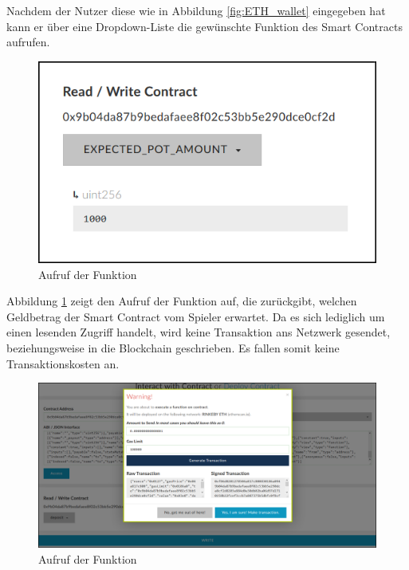 Nachdem der Nutzer diese wie in Abbildung \ref{fig:ETH_wallet} eingegeben hat kann er über eine Dropdown-Liste die gewünschte Funktion des Smart Contracts aufrufen.

\begin{figure}[H]
\centering
\includegraphics[scale=0.85]{Figures/eth_gui/ETH_wallet_expected_amount}
\decoRule
\caption{Aufruf der  Funktion}
\label{fig:ETH_wallet_expected_amount}
\end{figure}

Abbildung \ref{fig:ETH_wallet_expected_amount} zeigt den Aufruf der Funktion auf, die zurückgibt, welchen Geldbetrag der Smart Contract vom Spieler erwartet. Da es sich lediglich um einen lesenden Zugriff handelt, wird keine Transaktion ans Netzwerk gesendet, beziehungsweise in die Blockchain geschrieben. Es fallen somit keine Transaktionskosten an.

\begin{figure}[H]
\centering
\includegraphics[width=1\linewidth]{Figures/eth_gui/ETH_wallet_deposit}
\decoRule
\caption{Aufruf der  Funktion}
\label{fig:ETH_wallet_deposit}
\end{figure}

